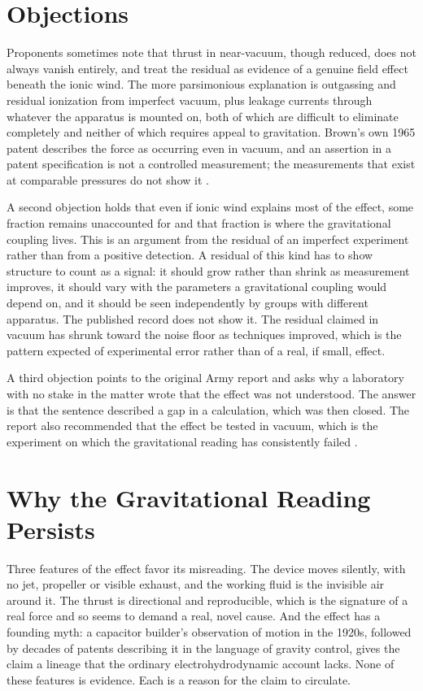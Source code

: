\documentclass[11pt]{article}
\begin{document}
\section{Objections}

Proponents sometimes note that thrust in near-vacuum, though reduced, does not always vanish entirely, and treat the residual as evidence of a genuine field effect beneath the ionic wind. The more parsimonious explanation is outgassing and residual ionization from imperfect vacuum, plus leakage currents through whatever the apparatus is mounted on, both of which are difficult to eliminate completely and neither of which requires appeal to gravitation. Brown's own 1965 patent describes the force as occurring even in vacuum, and an assertion in a patent specification is not a controlled measurement; the measurements that exist at comparable pressures do not show it \cite{Brown1965,Talley1991}.

A second objection holds that even if ionic wind explains most of the effect, some fraction remains unaccounted for and that fraction is where the gravitational coupling lives. This is an argument from the residual of an imperfect experiment rather than from a positive detection. A residual of this kind has to show structure to count as a signal: it should grow rather than shrink as measurement improves, it should vary with the parameters a gravitational coupling would depend on, and it should be seen independently by groups with different apparatus. The published record does not show it. The residual claimed in vacuum has shrunk toward the noise floor as techniques improved, which is the pattern expected of experimental error rather than of a real, if small, effect.

A third objection points to the original Army report and asks why a laboratory with no stake in the matter wrote that the effect was not understood. The answer is that the sentence described a gap in a calculation, which was then closed. The report also recommended that the effect be tested in vacuum, which is the experiment on which the gravitational reading has consistently failed \cite{BF2003}.

\section{Why the Gravitational Reading Persists}

Three features of the effect favor its misreading. The device moves silently, with no jet, propeller or visible exhaust, and the working fluid is the invisible air around it. The thrust is directional and reproducible, which is the signature of a real force and so seems to demand a real, novel cause. And the effect has a founding myth: a capacitor builder's observation of motion in the 1920s, followed by decades of patents describing it in the language of gravity control, gives the claim a lineage that the ordinary electrohydrodynamic account lacks. None of these features is evidence. Each is a reason for the claim to circulate.
\end{document}
